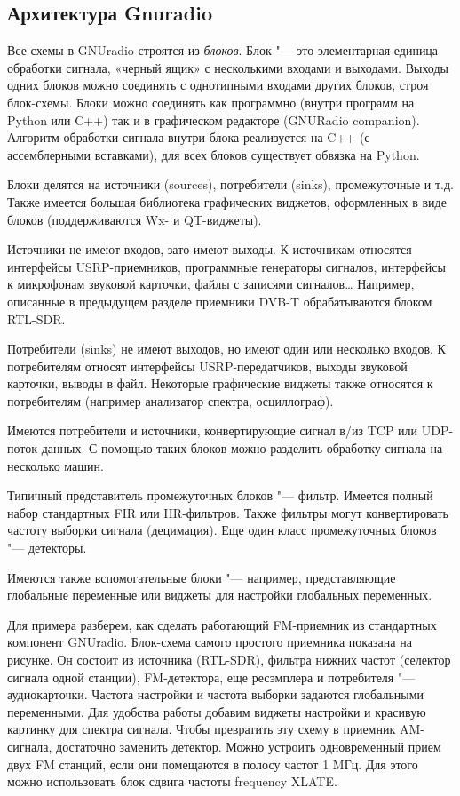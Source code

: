 \documentclass[10pt, a5paper]{article}
\begin{document}
\subsection*{Архитектура Gnuradio}

Все схемы в GNUradio строятся из \emph{блоков}. Блок "--- это элементарная единица обработки сигнала, «черный ящик» с несколькими входами и выходами. Выходы одних блоков можно соединять с однотипными входами других блоков, строя блок-схемы. Блоки можно соединять как программно (внутри программ на Python или C++) так и в графическом редакторе (GNURadio companion). Алгоритм обработки сигнала внутри блока реализуется на C++ (с ассемблерными вставками), для всех блоков существует обвязка на Python.

Блоки делятся на источники (sources), потребители (sinks), промежуточные и т.д. Также имеется большая библиотека графических виджетов, оформленных в виде блоков (поддерживаются Wx- и QT-виджеты).

Источники не имеют входов, зато имеют выходы. К источникам относятся интерфейсы USRP-приемников, программные генераторы сигналов, интерфейсы к микрофонам звуковой карточки, файлы с записями сигналов\ldots{} Например, описанные в предыдущем разделе приемники DVB-T  обрабатываются блоком RTL-SDR.

Потребители (sinks) не имеют выходов, но имеют один или несколько входов. К потребителям относят интерфейсы USRP-передатчиков, выходы звуковой карточки, выводы в файл. Некоторые графические виджеты также относятся к потребителям (например анализатор спектра, осциллограф).

Имеются потребители и источники, конвертирующие сигнал в/из TCP или UDP-поток данных. С помощью таких блоков можно разделить обработку сигнала на несколько машин.

Типичный представитель промежуточных блоков "--- фильтр. Имеется полный набор стандартных FIR или IIR-фильтров. Также фильтры могут конвертировать частоту выборки сигнала (децимация). Еще один класс промежуточных блоков "--- детекторы.

Имеются также вспомогательные блоки "--- например, представляющие глобальные переменные или виджеты для настройки глобальных переменных.

Для примера разберем, как сделать работающий FM-приемник из стандартных компонент GNUradio. Блок-схема самого простого приемника показана на рисунке.  Он состоит из источника (RTL-SDR), фильтра нижних частот (селектор сигнала одной станции), FM-детектора, еще ресэмплера и потребителя "--- аудиокарточки. Частота настройки и частота выборки задаются глобальными переменными. Для удобства работы добавим виджеты настройки и красивую картинку для спектра сигнала. Чтобы превратить эту схему в приемник AM-сигнала, достаточно заменить детектор. Можно устроить одновременный прием двух FM станций, если они помещаются в полосу частот 1 MГц. Для этого можно использовать блок сдвига частоты frequency XLATE.
\end{document}
